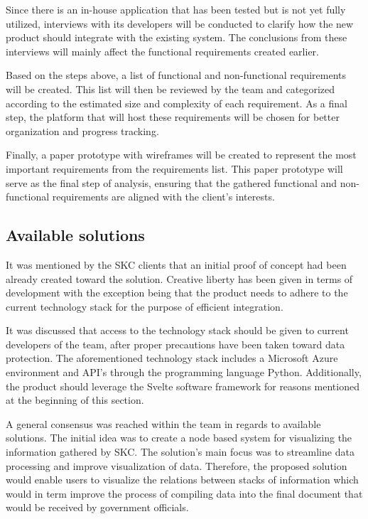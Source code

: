 Since there is an in-house application that has been tested but is not yet fully utilized, interviews with its developers will be conducted to clarify how the new product should integrate with the existing system. The conclusions from these interviews will mainly affect the functional requirements created earlier.

Based on the steps above, a list of functional and non-functional requirements will be created. This list will then be reviewed by the team and categorized according to the estimated size and complexity of each requirement. As a final step, the platform that will host these requirements will be chosen for better organization and progress tracking.

Finally, a paper prototype with wireframes will be created to represent the most important requirements from the requirements list. This paper prototype will serve as the final step of analysis, ensuring that the gathered functional and non-functional requirements are aligned with the client’s interests. 


 

\subsection{Available solutions}
\label{subsec:Available solutions}

It was mentioned by the SKC clients that an initial proof of concept had been already created toward the solution. Creative liberty has been given in terms of development with the exception being that the product needs to adhere to the current technology stack for the purpose of efficient integration.

It was discussed that access to the technology stack should be given to current developers of the team, after proper precautions have been taken toward data protection. The aforementioned technology stack includes a Microsoft Azure environment and API's through the programming language Python. Additionally, the product should leverage the Svelte software framework for reasons mentioned at the beginning of this section.

A general consensus was reached within the team in regards to available solutions. The initial idea was to create a node based system for visualizing the information gathered by SKC. The solution's main focus was to streamline data processing and improve visualization of data. Therefore, the proposed solution would enable users to visualize the relations between stacks of information which would in term improve the process of compiling data into the final document that would be received by government officials.

